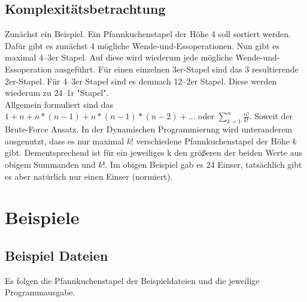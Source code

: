 \subsection{Komplexitätsbetrachtung}\label{subsec:komplexitatsbetrachtung}
Zunächst ein Beispiel.
Ein Pfannkuchenstapel der Höhe 4 soll sortiert werden.
Dafür gibt es zunächst 4 mögliche Wende-und-Essoperationen.
Nun gibt es maximal 4--3er Stapel.
Auf diese wird wiederum jede mögliche Wende-und-Essoperation ausgeführt.
Für einen einzelnen 3er-Stapel sind das 3 resultierende 2er-Stapel.
Für 4--3er Stapel sind es demnach 12--2er Stapel.
Diese werden wiederum zu 24--1r "Stapel". \\
Allgemein formuliert sind das $ 1 + n + n*(n-1) + n*(n - 1)*(n-2) + ...$ oder $\sum_{k=1}^{n} \frac{n!}{k!}$.
Soweit der Brute-Force Ansatz.
In der Dynamischen Programmierung wird unteranderem ausgenutzt, dass
es nur maximal $k!$ verschiedene Pfannkuchenstapel der Höhe $k$ gibt.
Dementsprechend ist für ein jeweiliges k den grö{\ss}eren der beiden Werte aus obigem Summanden und $k!$.
Im obigen Beispiel gab es 24 Einser, tatsächlich gibt es aber natürlich nur einen Einser (normiert).


\section{Beispiele}\label{sec:beispiele}

\subsection{Beispiel Dateien}\label{subsec:beispiel-dateien}
Es folgen die Pfannkuchenstapel der Beispieldateien und die jeweilige Programmausgabe.
